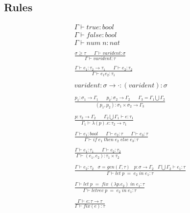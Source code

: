 \documentclass[10pt,a4paper,draft]{article}
\begin{document}
\begin{flushleft}
\subsection{Rules}
\begin{align*}
&\Gamma \vdash true : bool \tag{T-True} \\
&\Gamma \vdash false : bool \tag{T-False} \\
&\Gamma \vdash num \; n : nat \tag{T-Num} \\ \\
\tag{T-Mono}
&\frac{\sigma \geq \tau \;\;\;\;\;\; \Gamma \vdash varident:\sigma}{\Gamma \vdash varident:\tau}\\ \\
\tag{T-App}
&\frac{\Gamma \vdash e_{1}:\tau_{2} \rightarrow \tau_{1} \;\;\;\;\;\; \Gamma \vdash e_{2}:\tau_{2}}
{\Gamma \vdash e_{1}e_{2}:\tau_{1}} \\ \\
\tag{T-BuildContext1}
& varident:\sigma \rightarrow \cdot:(varident):\sigma \\ \\
\tag{T-BuildContext2}
&\frac{p_{1}:\sigma_{1} \rightarrow \Gamma_{1} \;\;\;\;\;\; p_{2}:\sigma_{2}\rightarrow \Gamma_{2} \;\;\;\;\;\; \Gamma_{3} = \Gamma_{1}\bigcup \Gamma_{2}}{(p_{1},p_{2}):\sigma_{1}\times \sigma_{2} \rightarrow \Gamma_{3}} \\ \\
\tag{T-Fun}
&\frac{p:\tau_{2} \rightarrow \Gamma_{2} \;\;\;\;\;\; \Gamma_{2} \bigcup \Gamma_{1} \vdash e:\tau_{1}}
{\Gamma_{1} \vdash \lambda(p).e:\tau_{2} \rightarrow \tau_{1}} \\ \\
\tag{T-IfThenElse}
&\frac{\Gamma \vdash e_{1}:bool \;\;\;\;\;\; \Gamma \vdash e_{2}:\tau \;\;\;\;\;\; \Gamma \vdash e_{3} : \tau}
{\Gamma \vdash if \; e_{1} \; then \; e_{2} \; else \; e_{3} : \tau} \\ \\
\tag{T-Pair}
&\frac{\Gamma \vdash e_{1}:\tau_{1} \;\;\;\;\;\; \Gamma \vdash e_{2}:\tau_{2}}
{\Gamma \vdash (e_{1},e_{2}) : \tau_{1}\times\tau_{2}} \\ \\
\tag{T-Let}
&\frac{\Gamma \vdash e_{2}:\tau_{2} \;\;\; \sigma=gen(\Gamma,\tau)\;\;\;p:\sigma\rightarrow \Gamma_{2} \;\;\; \Gamma \bigcup \Gamma_{2} \vdash e_{1}:\tau}
{\Gamma \vdash let\;p\;=\;e_{2}\;in\;e_{1}:\tau} \\ \\
\tag{T-Letrec}
&\frac{\Gamma \vdash let\;p\;=\;fix\;(\lambda p.e_{2})\;in\;e_{1}:\tau}
{\Gamma \vdash letrec\;p\;=\;e_{2}\;in\;e_{1}:\tau} \\ \\
\tag{T-Fix}
&\frac{\Gamma \vdash e : \tau \rightarrow \tau}
{\Gamma \vdash fix(e) : \tau}
\end{align*}


\end{flushleft}
\end{document}

